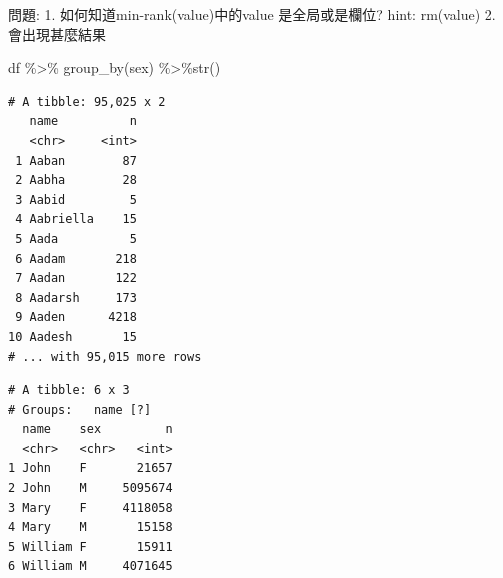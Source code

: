\documentclass[]{book}
\newenvironment{Shaded}{\begin{snugshade}}{\end{snugshade}}
\newcommand{\DataTypeTok}[1]{\textcolor[rgb]{0.13,0.29,0.53}{#1}}
\newcommand{\KeywordTok}[1]{\textcolor[rgb]{0.13,0.29,0.53}{\textbf{#1}}}
\newcommand{\NormalTok}[1]{#1}
\newcommand{\OperatorTok}[1]{\textcolor[rgb]{0.81,0.36,0.00}{\textbf{#1}}}
\newcommand{\StringTok}[1]{\textcolor[rgb]{0.31,0.60,0.02}{#1}}
\theoremstyle{definition}
\theoremstyle{definition}
\theoremstyle{definition}
\theoremstyle{remark}
\begin{document}
問題: 1. 如何知道min-rank(value)中的value 是全局或是欄位? hint:
rm(value) 2. 會出現甚麼結果

df \%\textgreater{}\% group\_by(sex) \%\textgreater{}\%str()

\begin{Shaded}
\end{Shaded}

\begin{Shaded}
\end{Shaded}

\begin{verbatim}
# A tibble: 95,025 x 2
   name          n
   <chr>     <int>
 1 Aaban        87
 2 Aabha        28
 3 Aabid         5
 4 Aabriella    15
 5 Aada          5
 6 Aadam       218
 7 Aadan       122
 8 Aadarsh     173
 9 Aaden      4218
10 Aadesh       15
# ... with 95,015 more rows
\end{verbatim}

\begin{Shaded}
\end{Shaded}

\begin{verbatim}
# A tibble: 6 x 3
# Groups:   name [?]
  name    sex         n
  <chr>   <chr>   <int>
1 John    F       21657
2 John    M     5095674
3 Mary    F     4118058
4 Mary    M       15158
5 William F       15911
6 William M     4071645
\end{verbatim}
\end{document}
